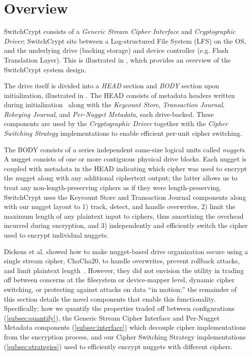 



\section{Overview} 
\label{subsec:overview}




SwitchCrypt consists of a \emph{Generic Stream Cipher Interface} and
\emph{Cryptographic Driver}; SwitchCrypt sits between a Log-structured File
System (LFS) on the OS, and the underlying drive (backing storage) and device
controller (e.g. Flash Translation Layer). This is illustrated in
, which provides an overview of the SwitchCrypt system design.


The drive itself is divided into a \emph{HEAD} section and \emph{BODY} section
upon initialization, illustrated in . The HEAD consists of
metadata headers written during initialization~\cite{StrongBox} along with the
\emph{Keycount Store}, \emph{Transaction Journal}, \emph{Rekeying Journal}, and
\emph{Per-Nugget Metadata}, each drive-backed. These components are used by the
\emph{Cryptographic Driver} together with the \emph{Cipher Switching Strategy}
implementations to enable efficient per-unit cipher switching.

The BODY consists of a series independent same-size logical units called
\emph{nuggets}. A nugget consists of one or more contiguous physical drive
blocks. Each nugget is coupled with metadata in the HEAD indicating which cipher
was used to encrypt the nugget along with any additional ciphertext output; the
latter allows us to treat any non-length-preserving ciphers as if they were
length-preserving. SwitchCrypt uses the Keycount Store and Transaction Journal
components along with our nugget layout to 1) track, detect, and handle
overwrites, 2) limit the maximum length of any plaintext input to ciphers, thus
amortizing the overhead incurred during encryption, and 3) independently and
efficiently switch the cipher used to encrypt individual nuggets.

Dickens et al. showed how to make nugget-based drive organization secure using a
single stream cipher, ChaCha20, to handle overwrites, prevent rollback attacks,
and limit plaintext length~\cite{StrongBox}. However, they did not envision the
utility in trading off between concerns at the filesystem or device-mapper
level, dynamic cipher switching, or protecting against attacks on data ``in
motion;'' the remainder of this section details the novel components that enable
this functionality. Specifically: how we quantify the properties traded off
between configurations (\cref{subsec:quantify}), the Generic Stream Cipher
Interface and Per-Nugget Metadata components (\cref{subsec:interface}) which
decouple cipher implementations from the encryption process, and our Cipher
Switching Strategy implementations (\cref{subsec:strategies}) used to
efficiently encrypt nuggets with different ciphers.
